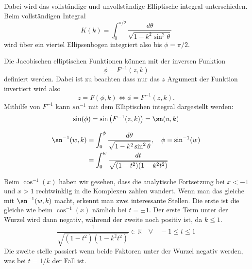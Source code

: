 \begin{refsection}
Dabei wird das vollständige und unvollständige Elliptische integral unterschieden.
Beim vollständigen Integral
\begin{equation}
    K(k)
    =
    \int_{0}^{\pi / 2}
    \frac{
        d\theta
    }{
        \sqrt{
            1-k^2 \sin^2 \theta
        }
    }
\end{equation}
wird über ein viertel Ellipsenbogen integriert also bis $\phi=\pi/2$.

Die Jacobischen elliptischen Funktionen können mit der inversen Funktion
\begin{equation}
    \phi = F^{-1}(z, k)
\end{equation}
definiert werden. Dabei ist zu beachten dass nur das $z$ Argument der Funktion invertiert wird also
\begin{equation}
    z = F(\phi, k)
    \Leftrightarrow
    \phi = F^{-1}(z, k).
\end{equation}
Mithilfe von $F^{-1}$ kann $sn^{-1}$ mit dem Elliptischen integral dargestellt werden:
\begin{equation}
    \sin(\phi)
    =
    \sin \left( F^{-1}(z, k) \right)
    =
    \sn(u, k)
\end{equation}

\begin{align}
    \sn^{-1}(w, k)
        & =
    \int_{0}^{\phi}
    \frac{
        d\theta
    }{
        \sqrt{
            1-k^2 \sin^2 \theta
        }
    },
    \quad
    \phi = \sin^{-1}(w)
    \\
        & =
    \int_{0}^{w}
    \frac{
        dt
    }{
        \sqrt{
            (1-t^2)(1-k^2 t^2)
        }
    }
\end{align}

Beim $\cos^{-1}(x)$ haben wir gesehen, dass die analytische Fortsetzung bei $x < -1$ und $x > 1$ rechtwinklig in die Komplexen zahlen wandert.
Wenn man das gleiche mit $\sn^{-1}(w, k)$ macht, erkennt man zwei interessante Stellen.
Die erste ist die gleiche wie beim $\cos^{-1}(x)$ nämlich bei $t = \pm 1$.
Der erste Term unter der Wurzel wird dann negativ, während der zweite noch positiv ist, da $k \leq 1$.
\begin{equation}
    \frac{
        1
    }{
        \sqrt{
            (1-t^2)(1-k^2 t^2)
        }
    }
    \in \mathbb{R}
    \quad \forall \quad
    -1 \leq t \leq 1
\end{equation}
Die zweite stelle passiert wenn beide Faktoren unter der Wurzel negativ werden, was bei $t = 1/k$ der Fall ist.





\end{refsection}

